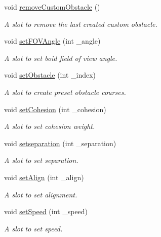 \begin{DoxyCompactItemize}
void \hyperlink{classGLWindow_a8501a6203119572cbdfcb11c1c9098ab}{removeCustomObstacle} ()
\begin{DoxyCompactList}\small\item\em A slot to remove the last created custom obstacle. \item\end{DoxyCompactList}\item 
void \hyperlink{classGLWindow_ad576b8165add39f4269afa6219ee70be}{setFOVAngle} (int \_\-angle)
\begin{DoxyCompactList}\small\item\em A slot to set boid field of view angle. \item\end{DoxyCompactList}\item 
void \hyperlink{classGLWindow_a6ac328520cd7812b3824d4bd3b2961ff}{setObstacle} (int \_\-index)
\begin{DoxyCompactList}\small\item\em A slot to create preset obstacle courses. \item\end{DoxyCompactList}\item 
void \hyperlink{classGLWindow_a66839b65997f0e7d52e47714b76199d6}{setCohesion} (int \_\-cohesion)
\begin{DoxyCompactList}\small\item\em A slot to set cohesion weight. \item\end{DoxyCompactList}\item 
void \hyperlink{classGLWindow_a638feb645e9c15dc4c2201d8d91d2eed}{setseparation} (int \_\-separation)
\begin{DoxyCompactList}\small\item\em A slot to set separation. \item\end{DoxyCompactList}\item 
void \hyperlink{classGLWindow_ad5015ebb615b203f870c293b116e842a}{setAlign} (int \_\-align)
\begin{DoxyCompactList}\small\item\em A slot to set alignment. \item\end{DoxyCompactList}\item 
void \hyperlink{classGLWindow_a151fe727550b818c321dfe1f6cbde599}{setSpeed} (int \_\-speed)
\begin{DoxyCompactList}\small\item\em A slot to set speed. \item\end{DoxyCompactList}\item 

\end{DoxyCompactItemize}
